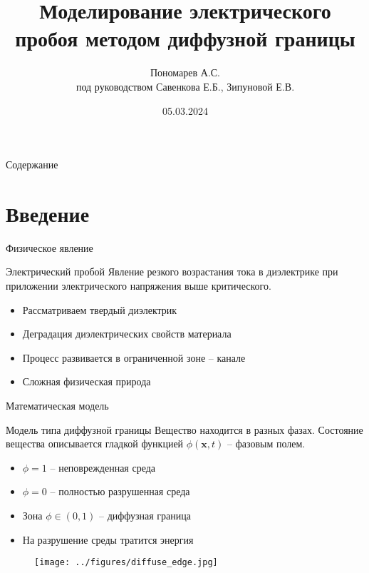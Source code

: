 \documentclass{beamer}
\title[Электрический пробой]{Моделирование электрического пробоя методом диффузной границы}
\author[]{Пономарев А.С. \\ под руководством Савенкова Е.Б., Зипуновой Е.В.}
\institute[]{группа Б05-029, 4 курс МФТИ}
\date{05.03.2024}
\begin{document}


\begin{frame}
\titlepage
\end{frame}


\begin{frame}{Содержание}
\Large
\tableofcontents
\end{frame}


\section{Введение}

\begin{frame}{Физическое явление}
\begin{block}{Электрический пробой}
	Явление резкого возрастания тока в диэлектрике при приложении электрического напряжения
	выше критического.
\end{block}
\begin{itemize}
	\item Рассматриваем твердый диэлектрик
	\item Деградация диэлектрических свойств материала
	\item Процесс развивается в ограниченной зоне -- канале
	\item Сложная физическая природа
\end{itemize}
\end{frame}


\begin{frame}{Математическая модель}
\begin{block}{Модель типа диффузной границы}
	Вещество находится в разных фазах. Состояние вещества описывается гладкой функцией
	$\phi(\textbf{x}, t)$ -- фазовым полем.
\end{block}
\begin{itemize}
	\item $\phi = 1$ -- неповрежденная среда
	\item $\phi = 0$ -- полностью разрушенная среда
	\item Зона $\phi \in (0, 1)$ -- диффузная граница
	\item На разрушение среды тратится энергия
\end{itemize}
\begin{figure}
	\texttt{[image: ../figures/diffuse\_edge.jpg]}
\end{figure}
\end{frame}
\end{document}
